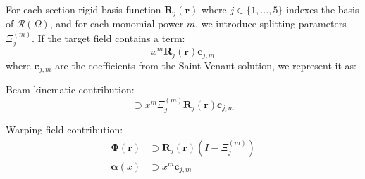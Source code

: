 
For each section-rigid basis function $\mathbf{R}_j(\bm{r})$ where $j \in \{1,\ldots,5\}$ indexes the basis of $\mathscr{R}(\Omega)$, and for each monomial power $m$, we introduce splitting parameters $\Xi_j^{(m)}$. 
If the target field contains a term:
\begin{equation}
x^m \mathbf{R}_j(\bm{r}) \mathbf{c}_{j,m}
\end{equation}
where $\mathbf{c}_{j,m}$ are the coefficients from the Saint-Venant solution, we represent it as:

Beam kinematic contribution:
\begin{equation}
[\bm{u}(x) + \bm{\theta}(x) \times \bm{r}] \supset x^m \Xi_j^{(m)} \mathbf{R}_j(\bm{r}) \mathbf{c}_{j,m}
\end{equation}

Warping field contribution:
\begin{equation}
\begin{aligned}
\bm{\Phi}(\bm{r}) &\supset \mathbf{R}_j(\bm{r})(I - \Xi_j^{(m)}) \\
\bm{\alpha}(x) &\supset x^m \mathbf{c}_{j,m}
\end{aligned}
\end{equation}


